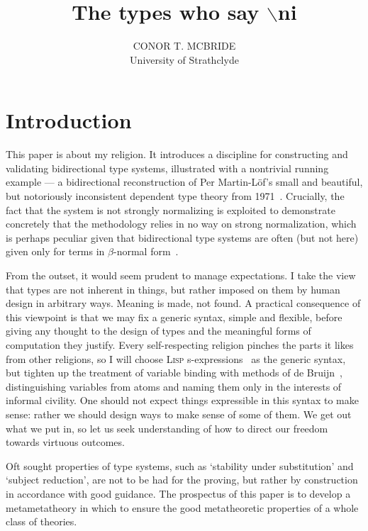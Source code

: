 \documentclass{jfp1}
\begin{document}
\title[Journal of Functional Programming]{The types who say $\backslash$ni}
\author[C. T. McBride]{CONOR T. MCBRIDE\\
  University of Strathclyde\\
  }
\maketitle

\section{Introduction}

This paper is about my religion. It introduces a discipline for
constructing and validating bidirectional type systems, illustrated
with a nontrivial running example --- a bidirectional reconstruction
of Per Martin-L\"of's small and beautiful, but notoriously
inconsistent dependent type theory from
1971~\cite{martinloef:atheoryoftypes}. Crucially, the fact that the
system is not strongly normalizing is exploited to demonstrate
concretely that the methodology relies in no way on strong
normalization, which is perhaps peculiar given that bidirectional type
systems are often (but not here) given only for terms in
$\beta$-normal form~\cite{DBLP:journals/toplas/PierceT00}.

From the outset, it would seem prudent to manage expectations. I take
the view that types are not inherent in things, but rather imposed on
them by human design in arbitrary ways. Meaning is made, not
found. A practical consequence of this viewpoint is that we may
fix a generic syntax, simple and flexible, before giving any thought
to the design of types and the meaningful forms of computation they
justify. Every self-respecting religion pinches the parts it likes
from other religions, so I will choose \textsc{Lisp} s-expressions~\cite{MCCARTHY60}
as the generic syntax, but tighten up the treatment of variable
binding with methods of de Bruijn~\cite{deBruijn:dummies},
distinguishing variables from atoms and naming them only in the
interests of informal civility. One should not expect things
expressible in this syntax to make sense: rather we should design
ways to make sense of some of them. We get out what we put
in, so let us seek understanding of how to direct our freedom towards virtuous
outcomes.

Oft sought properties of type systems, such as `stability under
substitution' and `subject reduction', are not to be had for the
proving, but rather by construction in accordance with good guidance.
The prospectus of this paper is to develop a metametatheory in which
to ensure the good metatheoretic properties of a whole class of theories.
\end{document}
